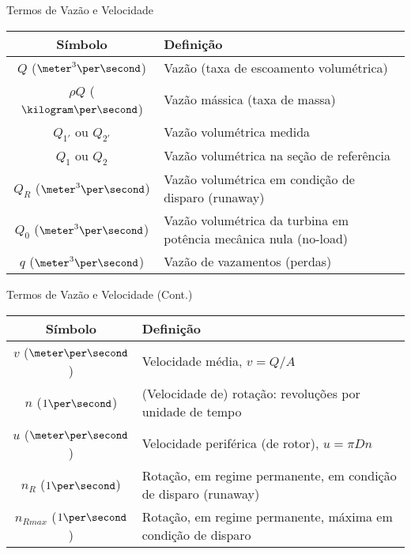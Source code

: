     \begin{frame}{Termos de Vazão e Velocidade}\vspace*{-1em}
        \setlength{\tabcolsep}{2mm}
        \noindent\begin{longtable}{cp{110mm}}
            \alert{Símbolo} & \alert{Definição} \\
            \hline
            $Q$ ($\meter^3\per\second$) &
            Vazão (taxa de escoamento volumétrica) \\
            $\rho Q$ ($\kilogram\per\second$) &
            Vazão mássica (taxa de massa) \\
            $Q_{1'}$ ou $Q_{2'}$ &
            Vazão volumétrica medida \\
            $Q_{1}$ ou $Q_{2}$ &
            Vazão volumétrica na seção de referência \\
            $Q_{R}$ ($\meter^3\per\second$) &
            Vazão volumétrica em condição de disparo (runaway) \\
            $Q_{0}$ ($\meter^3\per\second$) &
            Vazão volumétrica da turbina em potência mecânica nula (no-load) \\
            $q$ ($\meter^3\per\second$) &
            Vazão de vazamentos (perdas) \\
            \hline
        \end{longtable}
    \end{frame}

    \begin{frame}{Termos de Vazão e Velocidade (Cont.)}\vspace*{-1em}
        \setlength{\tabcolsep}{2mm}
        \noindent\begin{longtable}{cp{110mm}}
            \alert{Símbolo} & \alert{Definição} \\
            \hline
            $v$ ($\meter\per\second$) &
            Velocidade média, \alert{$v = Q/A$} \\
            $n$ ($1\per\second$) &
            (Velocidade de) rotação: revoluções por unidade de tempo \\
            $u$ ($\meter\per\second$) &
            Velocidade periférica (de rotor), \alert{$u = \pi Dn$} \\
            $n_{R}$ ($1\per\second$) &
            Rotação, em regime permanente, em condição de disparo (runaway) \\
            $n_{Rmax}$ ($1\per\second$) &
            Rotação, em regime permanente, máxima em condição de disparo \\
            \hline
        \end{longtable}
    \end{frame}

